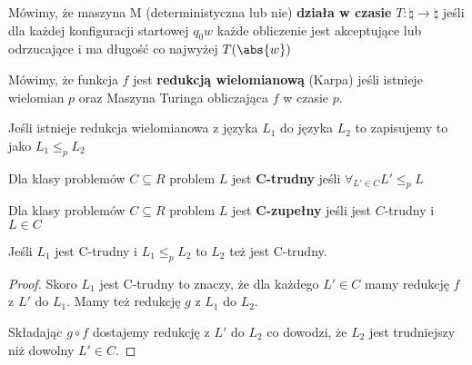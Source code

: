\begin{definition}
	Mówimy, że maszyna M (deterministyczna lub nie) \textbf{działa w czasie} \( T : \natural \rightarrow \natural \) jeśli dla każdej konfiguracji startowej \( q_0 w \) każde obliczenie jest akceptujące lub odrzucające i ma długość co najwyżej \( T(\abs{w}) \)
\end{definition}

\begin{definition}
	Mówimy, że funkcja \( f \) jest \textbf{redukcją wielomianową} (Karpa) jeśli istnieje wielomian \( p \) oraz Maszyna Turinga obliczająca \( f \) w czasie \( p \).

	Jeśli istnieje redukcja wielomianowa z języka \( L_1 \) do języka \( L_2 \) to zapisujemy to jako \( L_1 \leq_p L_2 \)
\end{definition}

\begin{definition}
	Dla klasy problemów \( C \subseteq R \) problem \( L \) jest \textbf{C-trudny} jeśli \( \forall_{L' \in C} L' \leq_p L \)
\end{definition}
\begin{definition}
	Dla klasy problemów \( C \subseteq R \) problem \( L \) jest \textbf{C-zupełny} jeśli jest \(C\)-trudny i \( L \in C \)
\end{definition}

\begin{lemma}
	Jeśli \( L_1 \) jest C-trudny i \( L_1 \leq_p L_2 \) to \( L_2 \) też jest C-trudny.
\end{lemma}

\begin{proof}
	Skoro \( L_1 \) jest C-trudny to znaczy, że dla każdego \( L' \in C \) mamy redukcję \( f \) z \( L' \) do \( L_1 \).
	Mamy też redukcję \( g \) z \( L_1 \) do \( L_2 \).

	Składając \( g \circ f \) dostajemy redukcję z \( L' \)  do \( L_2 \) co dowodzi, że \( L_2 \) jest trudniejszy niż dowolny \( L' \in C \).
\end{proof}
